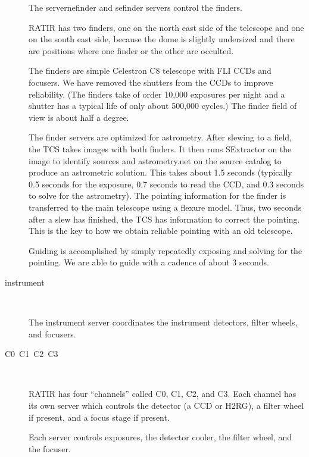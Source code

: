 \documentclass{article}
\newcommand{\server}[1]{{\ttfamily #1}}
\begin{document}
\begin{description}
The server{nefinder} and \server{sefinder} servers control the finders.

RATIR has two finders, one on the north east side of the telescope and one on the south east side, because the dome is slightly undersized and there are positions where one finder or the other are occulted.

The finders are simple Celestron C8 telescope with FLI CCDs and focusers. We have removed the shutters from the CCDs to improve reliability. (The finders take of order 10,000 exposures per night and a shutter has a typical life of only about 500,000 cycles.) The finder field of view is about half a degree.

The finder servers are optimized for astrometry. After slewing to a field, the TCS takes images with both finders. It then runs SExtractor on the image to identify sources and astrometry.net on the source catalog to produce an astrometric solution. This takes about 1.5 seconds (typically 0.5 seconds for the exposure, 0.7 seconds to read the CCD, and 0.3 seconds to solve for the astrometry). The pointing information for the finder is transferred to the main telescope using a flexure model. Thus, two seconds after a slew has finished, the TCS has information to correct the pointing. This is the key to how we obtain reliable pointing with an old telescope.

Guiding is accomplished by simply repeatedly exposing and solving for the pointing. We are able to guide with a cadence of about 3 seconds. 

\item[\server{instrument}]~

The \server{instrument} server coordinates the instrument detectors, filter wheels, and focusers.

\item[\server{C0}~\server{C1}~\server{C2}~\server{C3}]~

RATIR has four “channels” called C0, C1, C2, and C3. Each channel has its own server which controls the detector (a CCD or H2RG), a filter wheel if present, and a focus stage if present.

Each server controls exposures, the detector cooler, the filter wheel, and the focuser. 


\end{description}
\end{document}
